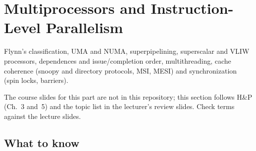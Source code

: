 \section{Multiprocessors and Instruction-Level Parallelism}
\label{sec:mp}

Flynn's classification, UMA and NUMA, superpipelining, superscalar and VLIW
processors, dependences and issue/completion order, multithreading, cache coherence
(snoopy and directory protocols, MSI, MESI) and synchronization (spin locks,
barriers).

\begin{remark}
The course slides for this part are not in this repository; this section follows
H\&P (Ch.~3 and~5) and the topic list in the lecturer's review slides. Check terms
against the lecture slides.
\end{remark}

\subsection{What to know}

